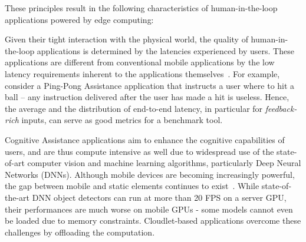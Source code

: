 
These principles result in the following characteristics of human-in-the-loop applications powered by edge computing:

\begin{description}[labelindent=\parindent, listparindent=\parindent, style=unboxed, leftmargin=0cm]
	\item[Latency Sensitive:] Given their tight interaction with the physical world, the quality of human-in-the-loop applications is determined by the latencies experienced by users. 
    These applications are different from conventional mobile applications by the low latency requirements inherent to the applications themselves~\cite{Suzuki2016Vehicle,Chen2017Empirical}. 
    For example, consider a Ping-Pong Assistance application that instructs a user where to hit a ball -- any instruction delivered after the user has made a hit is useless.
  Hence, the average and the distribution of end-to-end latency, in particular for \emph{feedback-rich} inputs, can serve as good metrics for a benchmark tool. 
	
    \item[Compute Intensive:] Cognitive Assistance applications aim to enhance the cognitive capabilities of users, and are thus compute intensive as well due to widespread use of the state-of-art computer vision and machine learning algorithms, particularly Deep Neural Networks (DNNs). 
    Although mobile devices are becoming increasingly powerful, the gap between mobile and static elements continues to exist~\cite{Flinn2012Cyber}. 
    While state-of-the-art DNN object detectors can run at more than 20 FPS on a server GPU, their performances are much worse on mobile GPUs - some models cannot even be loaded due to memory constraints. 
    Cloudlet-based applications overcome these challenges by offloading the computation. 

\end{description}


